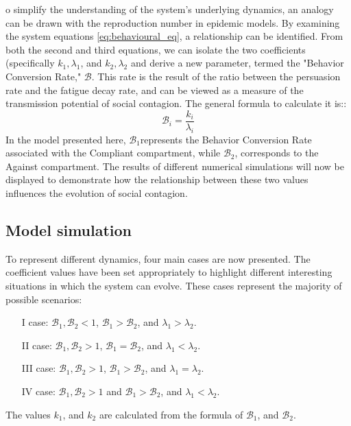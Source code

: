 o simplify the understanding of the system's underlying dynamics, an analogy can be drawn with the reproduction number in epidemic models. By examining the system equations \ref{eq:behavioural_eq}, a relationship can be identified. From both the second and third equations, we can isolate the two coefficients (specifically $k_1 , \lambda_1 $, and  $k_2 , \lambda_2 $ and derive a new parameter, termed the "Behavior Conversion Rate," $\mathcal{B}$. This rate is the result of the ratio between the persuasion rate and the fatigue decay rate, and can be viewed as a measure of the transmission potential of social contagion. The general formula to calculate it is::
\begin{equation}
	\mathcal{B}_i =\frac{ k_i }{\lambda_i}
	\label{eq:behave_rate}
\end{equation}
In the model presented here, $\mathcal{B}_1$represents the Behavior Conversion Rate associated with the Compliant compartment, while $\mathcal{B}_2$, corresponds to the Against compartment. The results of different numerical simulations will now be displayed to demonstrate how the relationship between these two values influences the evolution of social contagion.

\subsection{Model simulation}
To represent different dynamics, four main cases are now presented. The coefficient values have been set appropriately to highlight different interesting situations in which the system can evolve. These cases represent the majority of possible scenarios:

\begin{itemize}
	\item[I] case: $\mathcal{B}_1, \mathcal{B}_2 <1$, $\mathcal{B}_1 >  \mathcal{B}_2$, and $\lambda_1 > \lambda_2$.
	\item[II] case: $\mathcal{B}_1, \mathcal{B}_2 >1$, $\mathcal{B}_1 =  \mathcal{B}_2$, and $\lambda_1 < \lambda_2$.
	\item[III] case: $\mathcal{B}_1, \mathcal{B}_2 >1$, $\mathcal{B}_1 >  \mathcal{B}_2$, and $\lambda_1 = \lambda_2$.
	\item[IV] case: $\mathcal{B}_1, \mathcal{B}_2 >1$ and $\mathcal{B}_1 >  \mathcal{B}_2$, and $\lambda_1 < \lambda_2$.
\end{itemize}

The values $k_1$, and $k_2$ are calculated from the formula of $\mathcal{B}_1$, and $\mathcal{B}_2$.

